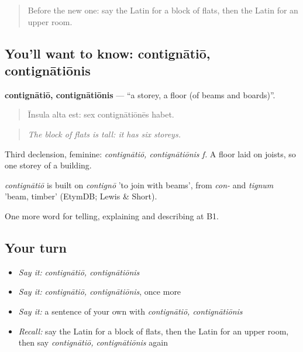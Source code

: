 \label{lesson:LA-C457-contignatio}



\begin{quote}
Before the new one: say the Latin for a block of flats, then the Latin for an upper room.
\end{quote}

\subsection*{You'll want to know: contignātiō, contignātiōnis}
\textbf{contignātiō, contignātiōnis} — \textquotedblleft{}a storey, a floor (of beams and boards)\textquotedblright{}.

\begin{quote}
Īnsula alta est: sex contignātiōnēs habet.
\end{quote}

\begin{quote}
\emph{The block of flats is tall: it has six storeys.}
\end{quote}

Third declension, feminine: \emph{contignātiō, contignātiōnis f.} A floor laid on joists, so one storey of a building.

\begin{cousinweb}
\emph{contignātiō} is built on \emph{contignō} 'to join with beams', from \emph{con-} and \emph{tignum} 'beam, timber' (EtymDB; Lewis \& Short).
\end{cousinweb}

\begin{grammarlens}[title={What you've built}]
One more word for telling, explaining and describing at B1.
\end{grammarlens}

\subsection*{Your turn}
\begin{itemize}
\raggedright
  \item \emph{Say it:} \emph{contignātiō, contignātiōnis}
  \item \emph{Say it:} \emph{contignātiō, contignātiōnis}, once more
  \item \emph{Say it:} a sentence of your own with \emph{contignātiō, contignātiōnis}
  \item \emph{Recall:} say the Latin for a block of flats, then the Latin for an upper room, then say \emph{contignātiō, contignātiōnis} again
\end{itemize}

